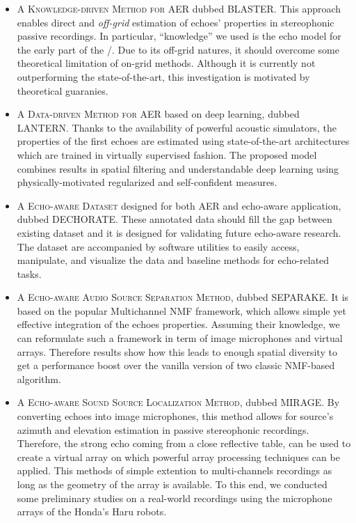 \begin{itemize}

    \item A \textsc{Knowledge-driven Method for AER} dubbed \acs{BLASTER}.
    This approach enables direct and \textit{off-grid} estimation of echoes' properties in stereophonic passive recordings.
    In particular, ``knowledge'' we used is the echo model for the early part of the \RIRs/.
    Due to its off-grid natures, it should overcome some theoretical limitation of on-grid methods.
    Although it is currently not outperforming the state-of-the-art, this investigation is motivated by theoretical guaranies.

    \item A \textsc{Data-driven Method for AER} based on deep learning, dubbed \acs{LANTERN}.
    Thanks to the availability of powerful acoustic simulators, the properties of the first echoes are estimated using state-of-the-art architectures which are trained in virtually supervised fashion.
    The proposed model combines results in spatial filtering and understandable deep learning using physically-motivated regularized and self-confident measures.

    \item A \textsc{Echo-aware Dataset} designed for both AER and echo-aware application, dubbed \acs{DECHORATE}.
    These annotated data should fill the gap between existing dataset and it is designed for validating future echo-aware research.
    The dataset are accompanied by software utilities to easily access, manipulate, and visualize the data and baseline methods for echo-related tasks.

    \item A \textsc{Echo-aware Audio Source Separation Method}, dubbed \acs{SEPARAKE}.
    It is based on the popular Multichannel NMF framework, which allows simple yet effective integration of the echoes properties.
    Assuming their knowledge, we can reformulate such a framework in term of image microphones and virtual arrays.
    Therefore results show how this leads to enough spatial diversity to get a performance boost over the vanilla version of two classic NMF-based algorithm.

    \item A \textsc{Echo-aware Sound Source Localization Method}, dubbed \acs{MIRAGE}.
    By converting echoes into image microphones, this method allows for source's azimuth and elevation estimation in passive stereophonic recordings.
    Therefore, the strong echo coming from a close reflective table, can be used to create a virtual array on which powerful array processing techniques can be applied.
    This methods of simple extention to multi-channels recordings as long as the geometry of the array is available.
    To this end, we conducted some preliminary studies on a real-world recordings using the microphone arrays of the Honda's Haru robots.


\end{itemize}

